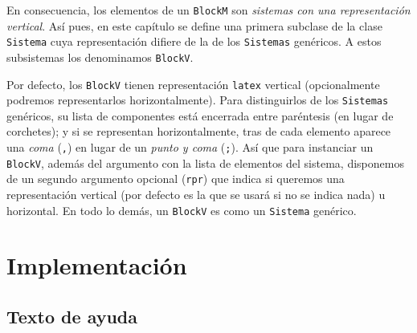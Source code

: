 \documentclass[11pt]{report}
\begin{document}
En consecuencia, los elementos de un \texttt{BlockM} son \emph{sistemas con una
representación vertical}. Así pues, en este capítulo se define una
primera subclase de la clase \texttt{Sistema} cuya representación difiere de
la de los \texttt{Sistemas} genéricos. A estos subsistemas los denominamos
\texttt{BlockV}.

Por defecto, los \texttt{BlockV} tienen representación \texttt{latex} vertical
(opcionalmente podremos representarlos horizontalmente). Para
distinguirlos de los \texttt{Sistemas} genéricos, su lista de componentes
está encerrada entre paréntesis (en lugar de corchetes); y si se
representan horizontalmente, tras de cada elemento aparece una \emph{coma}
(\texttt{,}) en lugar de un \emph{punto y coma} (\texttt{;}). Así que para instanciar un
\texttt{BlockV}, además del argumento con la lista de elementos del sistema,
disponemos de un segundo argumento opcional (\texttt{rpr}) que indica si
queremos una representación vertical (por defecto es la que se usará
si no se indica nada) u horizontal. En todo lo demás, un \texttt{BlockV} es
como un \texttt{Sistema} genérico.

\section{Implementación}
\label{sec:org5dfac46}

\subsection{Texto de ayuda}
\label{sec:org8eec7c7}
\end{document}
